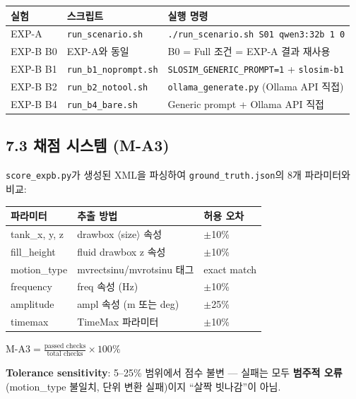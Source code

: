\documentclass[10pt,a4paper]{article}
\begin{document}
\begin{center}
\small
\begin{tabular}{llp{6.5cm}}
\toprule
\textbf{실험} & \textbf{스크립트} & \textbf{실행 명령} \\
\midrule
EXP-A & \texttt{run\_scenario.sh} & \texttt{./run\_scenario.sh S01 qwen3:32b 1 0} \\
EXP-B B0 & EXP-A와 동일 & B0 = Full 조건 = EXP-A 결과 재사용 \\
EXP-B B1 & \texttt{run\_b1\_noprompt.sh} & \texttt{SLOSIM\_GENERIC\_PROMPT=1} + \texttt{slosim-b1} \\
EXP-B B2 & \texttt{run\_b2\_notool.sh} & \texttt{ollama\_generate.py} (Ollama API 직접) \\
EXP-B B4 & \texttt{run\_b4\_bare.sh} & Generic prompt + Ollama API 직접 \\
\bottomrule
\end{tabular}
\end{center}

\subsection{7.3 채점 시스템 (M-A3)}

\texttt{score\_expb.py}가 생성된 XML을 파싱하여 \texttt{ground\_truth.json}의 8개 파라미터와 비교:

\begin{center}
\small
\begin{tabular}{lll}
\toprule
\textbf{파라미터} & \textbf{추출 방법} & \textbf{허용 오차} \\
\midrule
tank\_x, y, z & drawbox $\langle$size$\rangle$ 속성 & $\pm$10\% \\
fill\_height & fluid drawbox z 속성 & $\pm$10\% \\
motion\_type & mvrectsinu/mvrotsinu 태그 & exact match \\
frequency & freq 속성 (Hz) & $\pm$10\% \\
amplitude & ampl 속성 (m 또는 deg) & $\pm$25\% \\
timemax & TimeMax 파라미터 & $\pm$10\% \\
\bottomrule
\end{tabular}
\end{center}

$\text{M-A3} = \frac{\text{passed checks}}{\text{total checks}} \times 100\%$

\textbf{Tolerance sensitivity}: 5--25\% 범위에서 점수 불변 --- 실패는 모두 \textbf{범주적 오류}(motion\_type 불일치, 단위 변환 실패)이지 ``살짝 빗나감''이 아님.
\end{document}
